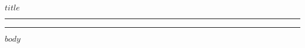 \documentclass[12pt]{article}
\begin{document}
\begin{center}
  \textbf{\Huge $title$}\\
  \vspace{0.2cm}
  \rule{\textwidth}{0.5pt}
\end{center}
\tableofcontents
\begin{center}
  \rule{\textwidth}{0.5pt}
\end{center}
$body$
\end{document}
